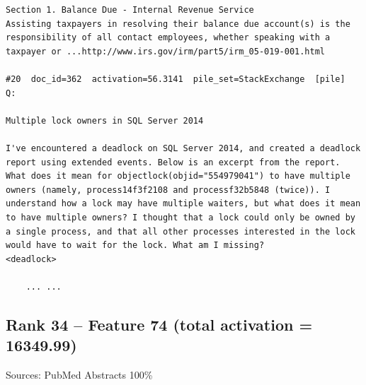 \begin{verbatim}
Section 1. Balance Due - Internal Revenue Service
Assisting taxpayers in resolving their balance due account(s) is the responsibility of all contact employees, whether speaking with a taxpayer or ...http://www.irs.gov/irm/part5/irm_05-019-001.html

#20  doc_id=362  activation=56.3141  pile_set=StackExchange  [pile]
Q:

Multiple lock owners in SQL Server 2014

I've encountered a deadlock on SQL Server 2014, and created a deadlock report using extended events. Below is an excerpt from the report. 
What does it mean for objectlock(objid="554979041") to have multiple owners (namely, process14f3f2108 and processf32b5848 (twice)). I understand how a lock may have multiple waiters, but what does it mean to have multiple owners? I thought that a lock could only be owned by a single process, and that all other processes interested in the lock would have to wait for the lock. What am I missing?
<deadlock>

    ... ...

\end{verbatim}

\subsection*{Rank 34 -- Feature 74 (total activation = 16349.99)}

Sources: PubMed Abstracts 100\%

